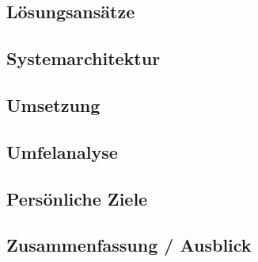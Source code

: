 \begin{spacing}{1}
	\chapter{Lösungsansätze}\label{chapter:solution}
	\end{spacing}
	

\begin{spacing}{1}
	\chapter{Systemarchitektur}
\end{spacing}


\begin{spacing}{1}
\chapter{Umsetzung}\label{chapter:implementation}
\end{spacing}


\begin{spacing}{1}
	\chapter{Umfelanalyse}\label{chapter:environmentAnalysis}
	\end{spacing}
	

\begin{spacing}{1}
	\chapter{Persönliche Ziele}\label{chapter:personal Goals}
	\end{spacing}
	

\begin{spacing}{1}
\chapter{Zusammenfassung / Ausblick}
\end{spacing}


\newpage
{}
\setcounter{page}{\value{RPages}}

\glsnogroupskiptrue
\printglossary[title=Glossar,toctitle=Glossar] %
\listoffigures
\listoftables
\lstlistoflistings
\appendix
{}



